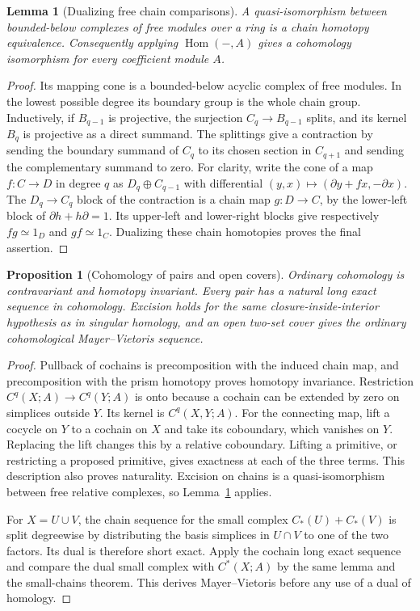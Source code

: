 \documentclass[11pt,oneside,openany]{book}
\theoremstyle{plain}
\newtheorem{lemma}[theorem]{Lemma}
\newtheorem{proposition}[theorem]{Proposition}
\theoremstyle{definition}
\theoremstyle{remark}
\begin{document}
\begin{lemma}[Dualizing free chain comparisons]\label{lem:p202-free-chain-dual}
A quasi-isomorphism between bounded-below complexes of free
modules over a ring is a chain homotopy equivalence. Consequently
applying \(\operatorname{Hom}(-,A)\) gives a cohomology
isomorphism for every coefficient module \(A\).
\end{lemma}
\begin{proof}
Its mapping cone is a bounded-below acyclic complex of free
modules. In the lowest possible degree its boundary group
is the whole chain group. Inductively, if \(B_{q-1}\) is
projective, the surjection \(C_q\to B_{q-1}\) splits, and its
kernel \(B_q\) is projective as a direct summand. The splittings
give a contraction by sending the boundary summand of \(C_q\)
to its chosen section in \(C_{q+1}\) and sending the complementary
summand to zero. For clarity, write the cone of a map
\(f:C\to D\) in degree \(q\) as \(D_q\oplus C_{q-1}\) with
differential \((y,x)\mapsto(\partial y+fx,-\partial x)\).
The \(D_q\to C_q\) block of the contraction is a chain map
\(g:D\to C\), by the lower-left block of
\(\partial h+h\partial=1\). Its upper-left and lower-right
blocks give respectively \(fg\simeq 1_D\) and \(gf\simeq1_C\).
Dualizing these chain homotopies proves the final assertion.
\end{proof}

\begin{proposition}[Cohomology of pairs and open covers]\label{prop:p202-cohomology-pairs}
Ordinary cohomology is contravariant and homotopy invariant.
Every pair has a natural long exact sequence in cohomology.
Excision holds for the same closure-inside-interior
hypothesis as in singular homology, and an open two-set cover
gives the ordinary cohomological Mayer--Vietoris sequence.
\end{proposition}
\begin{proof}
Pullback of cochains is precomposition with the induced chain
map, and precomposition with the prism homotopy proves
homotopy invariance. Restriction \(C^q(X;A)\to C^q(Y;A)\)
is onto because a cochain can be extended by zero on simplices
outside \(Y\). Its kernel is \(C^q(X,Y;A)\). For the connecting
map, lift a cocycle on \(Y\) to a cochain on \(X\) and take its
coboundary, which vanishes on \(Y\). Replacing the lift changes
this by a relative coboundary. Lifting a primitive, or restricting
a proposed primitive, gives exactness at each of the three
terms. This description also proves naturality. Excision on
chains is a quasi-isomorphism between free relative complexes,
so Lemma~\ref{lem:p202-free-chain-dual} applies.

For \(X=U\cup V\), the chain sequence for the small complex
\(C_*(U)+C_*(V)\) is split degreewise by distributing the
basis simplices in \(U\cap V\) to one of the two factors.
Its dual is therefore short exact. Apply the cochain long
exact sequence and compare the dual small complex with
\(C^*(X;A)\) by the same lemma and the small-chains theorem.
This derives Mayer--Vietoris before any use of a dual of
homology.
\end{proof}
\end{document}

